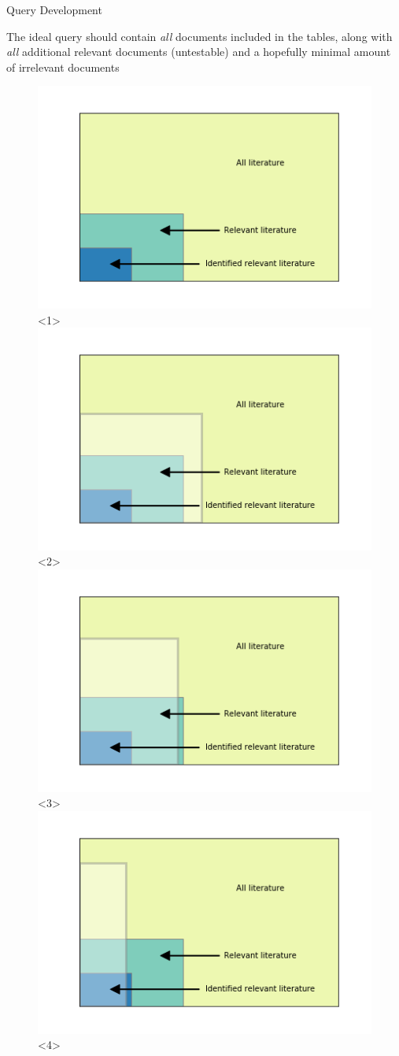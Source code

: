 \documentclass[9pt]{beamer}
\begin{document}
\begin{frame}{Query Development}

The ideal query should contain \textit{all} documents included in the tables, along with \textit{all} additional relevant documents (untestable) and a hopefully minimal amount of irrelevant documents

\begin{figure}
	\includegraphics[width=0.7\linewidth]{../plots/basic_lit_plot.png}<1>
	\includegraphics[width=0.7\linewidth]{../plots/lit_plot_query_1.png}<2>
	\includegraphics[width=0.7\linewidth]{../plots/lit_plot_query_3.png}<3>
	\includegraphics[width=0.7\linewidth]{../plots/lit_plot_query_2.png}<4>
\end{figure}

\end{frame}
\end{document}
